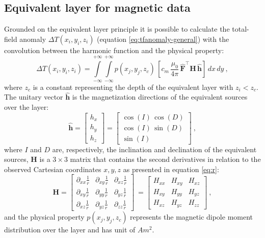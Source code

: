 \subsection*{Equivalent layer for magnetic data}

Grounded on the equivalent layer principle it is possible to calculate the total-field anomaly $\Delta T(x_i, y_i, z_i)$ (equation \ref{eq:tfanomaly-general}) with the convolution between the harmonic function and the physical property:
\begin{equation}
\Delta T(x_{i}, y_{i}, z_{i})
= \int \limits_{-\infty}^{+\infty}
\int \limits_{-\infty}^{+\infty}
p(x_j, y_j, z_{c}) \,
\left[ c_{m} \, \frac{\mu_{0}}{4\pi} \,
\hat{\mathbf{F}}^{\top} \mathbf{H} \, 
\hat{\mathbf{h}} \right] \,
dx \, dy \: ,
\label{eq:tf-p-continuous-mag-positive}
\end{equation}
where $z_c$ is a constant representing the depth of the equivalent layer with $z_i < z_c$. The unitary vector $\hat{\mathbf{h}}$ is the magnetization directions of the equivalent sources over the layer:
\begin{equation}
\hat{\mathbf{h}} = \left[
\begin{array}{c}
{h}_x \\
{h}_y \\
{h}_z
\end{array} \right] = 
 \left[
\begin{array}{c}
\cos(I) \, \cos(D) \\
\cos(I) \, \sin(D) \\
\sin(I)
\end{array}
\right] \: ,
\label{eq:h_hat}
\end{equation}
where $I$ and $D$ are, respectively, the inclination and declination of the equivalent sources, $\mathbf{H}$ is a $3 \times 3$ matrix that contains the second derivatives in relation to the observed Cartesian coordinates $x, y, z$ as presented in equation \ref{eq:r}:
\begin{equation}
\mathbf{H} =
\left[
\begin{array}{ccc}
\partial_{xx} \frac{1}{r} & 
\partial_{xy} \frac{1}{r} & 
\partial_{xz} \frac{1}{r} \\
\partial_{xy} \frac{1}{r} & 
\partial_{yy} \frac{1}{r} & 
\partial_{yz} \frac{1}{r} \\
\partial_{xz} \frac{1}{r} & 
\partial_{yz} \frac{1}{r} & 
\partial_{zz} \frac{1}{r}
\end{array}
\right] \: =
\left[
\begin{array}{ccc}
H_{xx} & 
H_{xy} & 
H_{xz} \\
H_{xy} & 
H_{yy} & 
H_{yz} \\
H_{xz} & 
H_{yz} & 
H_{zz}
\end{array}
\right] \: ,
\label{eq:Hi}
\end{equation}
and the physical property $p(x_j, y_j, z_{c})$ represents the magnetic dipole moment distribution over the layer and has unit of $Am^2$.


